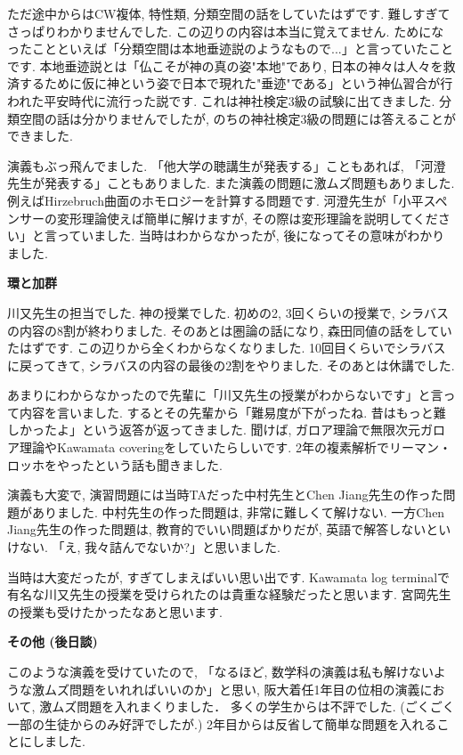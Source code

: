 ただ途中からはCW複体, 特性類, 分類空間の話をしていたはずです. 難しすぎてさっぱりわかりませんでした.
この辺りの内容は本当に覚えてません. 
ためになったことといえば「分類空間は本地垂迹説のようなもので...」と言っていたことです.
本地垂迹説とは「仏こそが神の真の姿"本地"であり, 日本の神々は人々を救済するために仮に神という姿で日本で現れた"垂迹"である」という神仏習合が行われた平安時代に流行った説です. これは神社検定3級の試験に出てきました. 
分類空間の話は分かりませんでしたが, のちの神社検定3級の問題には答えることができました. 

演義もぶっ飛んでました.
「他大学の聴講生が発表する」こともあれば, 「河澄先生が発表する」こともありました. また演義の問題に激ムズ問題もありました. 例えばHirzebruch曲面のホモロジーを計算する問題です. 河澄先生が「小平スペンサーの変形理論使えば簡単に解けますが, その際は変形理論を説明してください」と言っていました. 当時はわからなかったが, 後になってその意味がわかりました. 
\vspace{8pt} 

\textbf{環と加群}  　\vspace{-6pt} 

川又先生の担当でした. 神の授業でした. 
初めの2, 3回くらいの授業で, シラバスの内容の8割が終わりました. 
そのあとは圏論の話になり, 森田同値の話をしていたはずです. この辺りから全くわからなくなりました. 
10回目くらいでシラバスに戻ってきて, シラバスの内容の最後の2割をやりました. そのあとは休講でした. 

あまりにわからなかったので先輩に「川又先生の授業がわからないです」と言って内容を言いました. するとその先輩から「難易度が下がったね. 昔はもっと難しかったよ」という返答が返ってきました. 聞けば, ガロア理論で無限次元ガロア理論やKawamata coveringをしていたらしいです. 2年の複素解析でリーマン・ロッホをやったという話も聞きました.

演義も大変で, 演習問題には当時TAだった中村先生とChen Jiang先生の作った問題がありました. 中村先生の作った問題は, 非常に難しくて解けない. 一方Chen Jiang先生の作った問題は, 教育的でいい問題ばかりだが, 英語で解答しないといけない. 「え, 我々詰んでないか?」と思いました. 

当時は大変だったが, すぎてしまえばいい思い出です. Kawamata log terminalで有名な川又先生の授業を受けられたのは貴重な経験だったと思います. 宮岡先生の授業も受けたかったなあと思います. 
\vspace{8pt} 

\textbf{その他 (後日談)}  　\vspace{-6pt} 

このような演義を受けていたので, 「なるほど, 数学科の演義は私も解けないような激ムズ問題をいれればいいのか」と思い, 阪大着任1年目の位相の演義において, 激ムズ問題を入れまくりました． 多くの学生からは不評でした. (ごくごく一部の生徒からのみ好評でしたが.) 2年目からは反省して簡単な問題を入れることにしました. 
